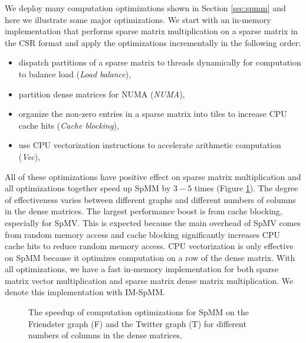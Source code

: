 We deploy many computation optimizations shown in Section \ref{sec:spmm} and
here we illustrate some major optimizations. We start with an in-memory
implementation that
performs sparse matrix multiplication on a sparse matrix in the CSR format
and apply the optimizations incrementally in the following order:
\begin{itemize} \itemsep1pt \parskip0pt 
	\item dispatch partitions of a sparse matrix to threads dynamically for
		computation to balance load (\textit{Load balance}),
	\item partition dense matrices for NUMA (\textit{NUMA}),
	\item organize the non-zero entries in a sparse matrix into tiles to
		increase CPU cache hits (\textit{Cache blocking}),
	\item use CPU vectorization instructions to accelerate arithmetic
		computation (\textit{Vec}),
\end{itemize}

All of these optimizations have positive effect on sparse matrix
multiplication and all optimizations together speed up SpMM by $3-5$ times
(Figure \ref{perf:spmm_opt}). The degree of effectiveness
varies between different graphs and different numbers of columns in
the dense matrices. The largest performance boost is from cache blocking,
especially for SpMV.
This is expected because the main overhead of SpMV comes from random memory
access and cache blocking significantly increases CPU cache hits to reduce
random memory access. CPU vectorization is only effective on SpMM because
it optimizes computation on a row of the dense matrix.
With all optimizations, we have a fast in-memory implementation for both
sparse matrix vector multiplication and sparse matrix dense matrix multiplication.
We denote this implementation with IM-SpMM.

\begin{figure}
	\begin{center}
		\footnotesize
		
		\caption{The speedup of computation optimizations for SpMM on the Friendster
			graph (F) and the Twitter graph (T) for different numbers of
			columns in the dense matrices.}
		\label{perf:spmm_opt}
	\end{center}
\end{figure}

